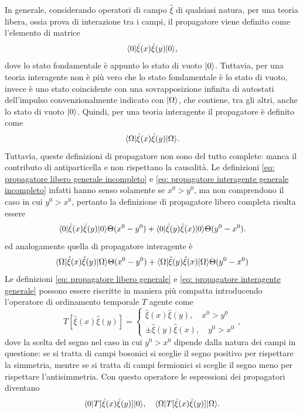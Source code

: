 In generale, considerando operatori di campo $\hat{\xi}$ di qualsiasi natura, per una teoria libera, ossia prova di interazione tra i campi, il propagatore viene definito come l'elemento di matrice
\begin{equation}
\label{eq: propagatore libero generale incompleto}
    \langle 0 | \hat{\xi}(x)\hat{\xi}(y) | 0 \rangle,
\end{equation}
dove lo stato fondamentale è appunto lo stato di vuoto $\ket{0}$. Tuttavia, per una teoria interagente non è più vero che lo stato fondamentale è lo stato di vuoto, invece è uno stato coincidente con una sovrapposizione infinita di autostati dell'impulso convenzionalmente indicato con $\ket{\Omega}$, che contiene, tra gli altri, anche lo stato di vuoto $\ket{0}$. Quindi, per una teoria interagente il propagatore è definito come
\begin{equation}
\label{eq: propagatore interagente generale incompleto}
    \langle \Omega | \hat{\xi}(x)\hat{\xi}(y) | \Omega \rangle.
\end{equation}
Tuttavia, queste definizioni di propagatore non sono del tutto complete: manca il contributo di antiparticella e non rispettano la causalità. Le definizioni \eqref{eq: propagatore libero generale incompleto} e \eqref{eq: propagatore interagente generale incompleto} infatti hanno senso solamente se $x^0 > y^0$, ma non comprendono il caso in cui $y^0 > x^0$, pertanto la definizione di propagatore libero completa risulta essere
\begin{equation}
\label{eq: propagatore libero generale}
    \langle 0 | \hat{\xi}(x)\hat{\xi}(y) | 0 \rangle\Theta(x^0 - y^0) + \langle 0 | \hat{\xi}(y)\hat{\xi}(x) | 0 \rangle\Theta(y^0 - x^0).
\end{equation}
ed analogamente quella di propagatore interagente è
\begin{equation}
\label{eq: propagatore interagente generale}
    \langle \Omega | \hat{\xi}(x)\hat{\xi}(y) | \Omega \rangle\Theta(x^0 - y^0) + \langle \Omega | \hat{\xi}(y)\hat{\xi}(x) | \Omega \rangle\Theta(y^0 - x^0)
\end{equation}
Le definizioni \eqref{eq: propagatore libero generale} e \eqref{eq: propagatore interagente generale} possono essere riscritte in maniera più compatta introducendo l'operatore di ordinamento temporale $T$ agente come
\begin{equation}
\label{eq: ordinamento temporale}
    T[\hat{\xi}(x)\hat{\xi}(y)] = 
    \begin{cases}
        \hat{\xi}(x)\hat{\xi}(y),\quad x^0 > y^0 \\
        \pm\hat{\xi}(y)\hat{\xi}(x),\quad y^0 > x^0
    \end{cases},
\end{equation}
dove la scelta del segno nel caso in cui $y^0 > x^0$ dipende dalla natura dei campi in questione: se si tratta di campi bosonici si sceglie il segno positivo per rispettare la simmetria, mentre se si tratta di campi fermionici si sceglie il segno meno per rispettare l'antisimmetria. Con questo operatore le espressioni dei propagatori diventano
\begin{equation}
    \langle 0 | T[\hat{\xi}(x)\hat{\xi}(y)] | 0 \rangle,\quad \langle \Omega | T[\hat{\xi}(x)\hat{\xi}(y)] | \Omega \rangle.
\end{equation}

